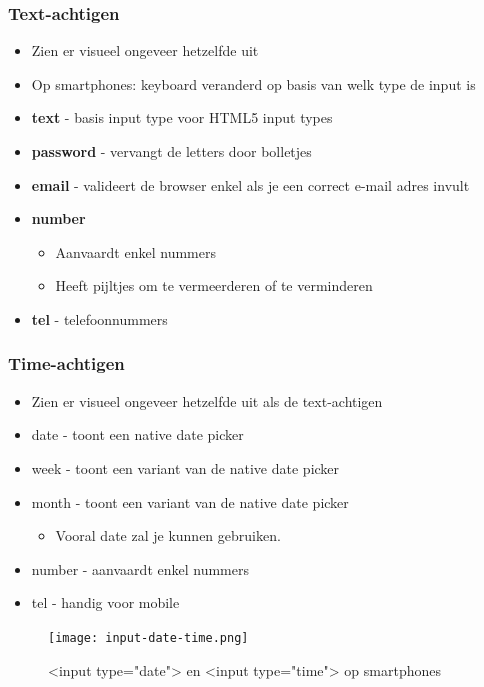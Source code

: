 \documentclass{article}
\newcommand{\bold}[1]{\textbf{#1}}
\begin{document}
\subsubsection{Text-achtigen}

\begin{itemize}
    \item Zien er visueel ongeveer hetzelfde uit
    \item Op smartphones: keyboard veranderd op basis van welk type de input is
    \item \bold{text} - basis input type voor HTML5 input types
    \item \bold{password} - vervangt de letters door bolletjes
    \item \bold{email} - valideert de browser enkel als je een correct e-mail adres invult
    \item \bold{number}
    \begin{itemize}
        \item Aanvaardt enkel nummers
        \item Heeft pijltjes om te vermeerderen of te verminderen
    \end{itemize}
    \item \bold{tel} - telefoonnummers
\end{itemize}

\subsubsection{Time-achtigen}

\begin{itemize}
    \item Zien er visueel ongeveer hetzelfde uit als de text-achtigen
    \item date - toont een native date picker
    \item week - toont een variant van de native date picker
    \item month - toont een variant van de native date picker
    \begin{itemize}
        \item Vooral date zal je kunnen gebruiken.
    \end{itemize}
    \item number - aanvaardt enkel nummers
    \item tel - handig voor mobile
\end{itemize}

\begin{figure}[H]
    \centering
    \texttt{[image: input-date-time.png]}
    \caption{<input type="date"> en <input type="time"> op smartphones}
\end{figure}
\end{document}
